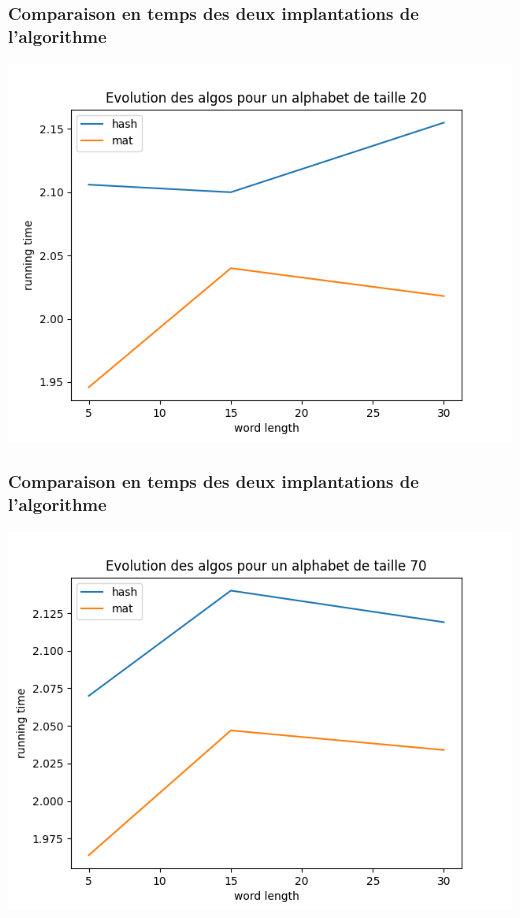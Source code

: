 \documentclass{beamer}
\begin{document}
  \begin{frame}
    \frametitle{Comparaison en temps des deux implantations de l'algorithme}
    \begin{center}
      \includegraphics[scale = 0.5]{../Courbes/alphabet_20.png}
    \end{center}
  \end{frame}

  \begin{frame}
    \frametitle{Comparaison en temps des deux implantations de l'algorithme}
    \begin{center}
      \includegraphics[scale = 0.5]{../Courbes/alphabet_70.png}
    \end{center}
  \end{frame}
\end{document}
